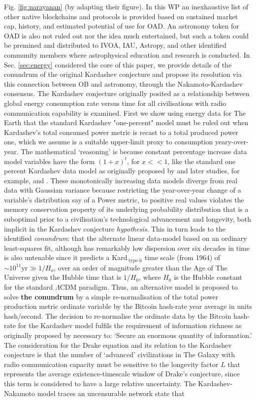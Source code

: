 \documentclass[final,5p,times,twocolumn,authoryear]{elsarticle}
\begin{document}
Fig. \ref{fig:narayanan} (by adapting their figure). In this WP an inexhaustive list of other native blockchains and protocols is provided based on sustained market cap, history, and estimated potential of use for OAD. An astronomy token for OAD is also not ruled out nor the idea much entertained, but such a token could be premined and distributed to IVOA, IAU, Astropy, and other identified community members where astrophysical education and research is conducted. In Sec. \ref{sec:energy} considered the core of this paper, we provide details of the conundrum of the original Kardashev conjecture and propose its resolution via this connection between OB and astronomy, through the Nakamoto-Kardashev consensus. The Kardashev conjecture originally posited as a relationship between global energy consumption rate versus time for all civilisations with radio communication capability is examined. First we show using energy data for The Earth that the standard Kardashev "one-percent" model must be ruled out when Kardashev's total consumed power metric is recast to a total produced power one, which we assume is a suitable upper-limit proxy to consumption yeary-over-year. The mathematical `reasoning' is because constant percentage increase data model variables have the form $(1+x)^{t}$, for $x<< 1$, like the standard one percent Kardashev data model as originally proposed by \cite{kar64} and later studies, for example, \cite{sagan73} and \cite{gray2020}. These monotonically increasing data models diverge from real data with Gaussian variance because restricting the year-over-year change of a variable's distribution say of a Power metric, to positive real values violates the memory conservation property of its underlying probability distribution that is a suboptimal prior to a civilisation's technological advancement and longevity, both implicit in the Kardashev conjecture \textit{hypothesis}. This in turn leads to the identified \textit{conundrum}: that the alternate linear data-model based on an ordinary least-squares fit, although has remarkably low dispersion over six decades in time is also untenable since it predicts a Kard$\,_{\textrm{type-ii}}$ time scale (from 1964) of $\sim 10^{11} \textrm{yr} \gg {1/H_o}$, over an order of magnitude greater than the Age of The Universe given the Hubble time that is $1/H{_0}$, where $H_{0}$ is the Hubble constant for the standard $\Lambda$CDM paradigm. Thus, an alternative model is proposed to solve \textbf{ the conundrum} by a simple re-normalisation of the total power production metric ordinate variable by the Bitcoin hash-rate year average in units hash/second. The decision to re-normalise the ordinate data by the Bitcoin hash-rate for the Kardashev model fulfils the requirement of information richness as originally proposed by \cite{kar64} necessary to: `Secure an enormous quantity of information.' The consideration for the Drake equation and its relation to the Kardashev conjecture is that the number of `advanced' civilizations in The Galaxy with radio communication capacity must be sensitive to the longevity factor $L$ that represents the average existence-timescale window of Drake's conjecture, since this term is considered to have a large relative uncertainty. The Kardashev-Nakamoto model traces an uncensurable network state that 
\end{document}
